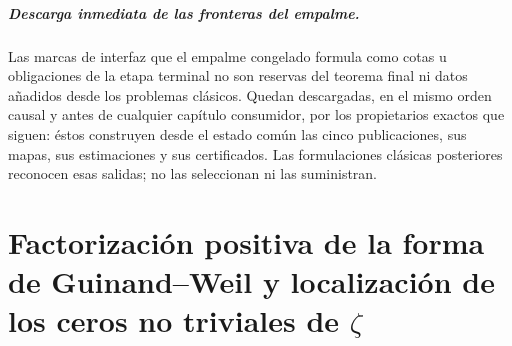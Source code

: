\paragraph{Descarga inmediata de las fronteras del empalme.}
Las marcas de interfaz que el empalme congelado formula como cotas u
obligaciones de la etapa terminal no son reservas del teorema final ni datos
añadidos desde los problemas clásicos. Quedan descargadas, en el mismo orden
causal y antes de cualquier capítulo consumidor, por los propietarios exactos
que siguen: éstos construyen desde el estado común las cinco publicaciones,
sus mapas, sus estimaciones y sus certificados. Las formulaciones clásicas
posteriores reconocen esas salidas; no las seleccionan ni las suministran.
\begin{HMTScientificOwnerSubordinated}

\end{HMTScientificOwnerSubordinated}


\begingroup
\HMTDemoteHeadings

\endgroup

\HMTFlushCurrentChapter
\chapter{Factorización positiva de la forma de Guinand--Weil y localización de los ceros no triviales de \texorpdfstring{\(\zeta\)}{zeta}}
\begingroup
\renewcommand{\chapter}[2][]{}%

\endgroup


\HMTFlushCurrentChapter
\chapter{Caracterización Cayley--Pontryagin de los ceros críticos y construcción coinductiva del campo espectral de Weil}
\begingroup
\renewcommand{\chapter}[2][]{}%

\endgroup


